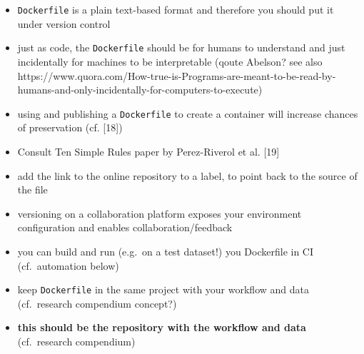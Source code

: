 \documentclass[10pt,letterpaper]{article}
\providecommand{\tightlist}{%
  \setlength{\itemsep}{0pt}\setlength{\parskip}{0pt}}
\begin{document}
\begin{itemize}
\tightlist
\item
  \texttt{Dockerfile} is a plain text-based format and therefore you
  should put it under version control
\item
  just as code, the \texttt{Dockerfile} should be for humans to
  understand and just incidentally for machines to be interpretable
  (qoute Abelson? see also
  https://www.quora.com/How-true-is-Programs-are-meant-to-be-read-by-humans-and-only-incidentally-for-computers-to-execute)
\item
  using and publishing a \texttt{Dockerfile} to create a container will
  increase chances of preservation (cf. {[}18{]})
\item
  Consult Ten Simple Rules paper by Perez-Riverol et al. {[}19{]}
\item
  add the link to the online repository to a label, to point back to the
  source of the file
\item
  versioning on a collaboration platform exposes your environment
  configuration and enables collaboration/feedback
\item
  you can build and run (e.g.~on a test dataset!) you Dockerfile in CI
  (cf.~automation below)
\item
  keep \texttt{Dockerfile} in the same project with your workflow and
  data (cf.~research compendium concept?)
\item
  \textbf{this should be the repository with the workflow and data}
  (cf.~research compendium)


\end{itemize}
\end{document}
